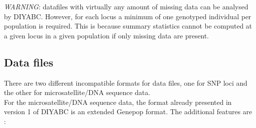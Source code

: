 \emph{WARNING}: datafiles with virtually any amount of missing data
can be analysed by DIYABC. However, for each locus a minimum of one
genotyped individual per population is required. This is because summary
statistics cannot be computed at a given locus in a given population
if only missing data are present.


\subsection{Data files}

There are two different incompatible formats for data files, one for
SNP loci and the other for microsatellite/DNA sequence data.\\
 For the microsatellite/DNA sequence data, the format already presented
in version 1 of DIYABC is an extended Genepop format. The additional
features are :
